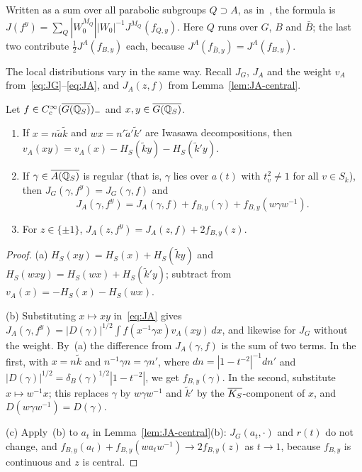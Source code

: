 Written as a sum over all parabolic subgroups $Q\supset A$, as
in~\cite{Ar88b,Ar88c}, the formula is $J(f^y)=\sum_Q|W_0^{M_Q}||W_0|^{-1}
J^{M_Q}(f_{Q,y})$. Here $Q$ runs over $G$, $B$ and $\bar B$; the last
two contribute $\frac12J^A(f_{B,y})$ each, because
$J^A(f_{\bar B,y})=J^A(f_{B,y})$.

The local distributions vary in the same way. Recall $J_G$, $J_A$ and the
weight $v_A$ from~\eqref{eq:JG}--\eqref{eq:JA}, and $J_A(z,f)$ from
Lemma~\ref{lem:JA-central}.

\begin{lemma}\label{lem:variance-local}
Let $f\in C_c^\infty(\overline{G(\mathbb{Q}_S)})_-$ and $x,y\in\overline{G(\mathbb{Q}_S)}$.
\begin{enumerate}[label=(\alph*)]
\item If $x=n\tilde a\tilde k$ and $wx=n'\tilde a'\tilde k'$ are Iwasawa
  decompositions, then
  $v_A(xy)=v_A(x)-H_S(\tilde ky)-H_S(\tilde k'y)$.
\item If $\gamma\in\overline{A(\mathbb{Q}_S)}$ is regular (that is, $\gamma$ lies over $a(t)$
  with $t_v^2\ne1$ for all $v\in S_k$), then $J_G(\gamma,f^y)=J_G(\gamma,f)$
  and
  \[
  J_A(\gamma,f^y)=J_A(\gamma,f)+f_{B,y}(\gamma)+f_{B,y}(w\gamma w^{-1}).
  \]
\item For $z\in\{\pm1\}$, $J_A(z,f^y)=J_A(z,f)+2f_{B,y}(z)$.
\end{enumerate}
\end{lemma}

\begin{proof}
(a) $H_S(xy)=H_S(x)+H_S(\tilde ky)$ and $H_S(wxy)=H_S(wx)+H_S(\tilde
k'y)$; subtract from $v_A(x)=-H_S(x)-H_S(wx)$.

(b) Substituting $x\mapsto
xy$ in~\eqref{eq:JA} gives $J_A(\gamma,f^y)=|D(\gamma)|^{1/2}\int
f(x^{-1}\gamma x)v_A(xy)\,dx$, and likewise for $J_G$ without the weight.
By~(a) the difference from $J_A(\gamma,f)$ is the sum of two terms. In the
first, with $x=n\tilde k$ and $n^{-1}\gamma n=\gamma n'$, where
$dn=|1-t^{-2}|^{-1}dn'$ and $|D(\gamma)|^{1/2}=\delta_B(\gamma)^{1/2}
|1-t^{-2}|$, we get $f_{B,y}(\gamma)$. In the second, substitute
$x\mapsto w^{-1}x$; this replaces $\gamma$ by $w\gamma w^{-1}$ and
$\tilde k'$ by the $\overline{K_S}$-component of $x$, and
$D(w\gamma w^{-1})=D(\gamma)$.

(c) Apply~(b) to $a_t$ in
Lemma~\ref{lem:JA-central}(b): $J_G(a_t,\cdot)$ and $r(t)$ do not change,
and $f_{B,y}(a_t)+f_{B,y}(wa_tw^{-1})\to2f_{B,y}(z)$ as $t\to1$, because
$f_{B,y}$ is continuous and $z$ is central.
\end{proof}

